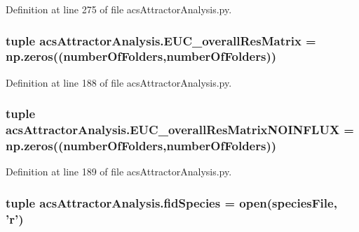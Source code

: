 Definition at line 275 of file acs\-Attractor\-Analysis.\-py.

\hypertarget{a00091_a920167afed4efad8feefc27bdbadba89}{
\subsubsection[{E\-U\-C\-\_\-overall\-Res\-Matrix}]{\setlength{\rightskip}{0pt plus 5cm}tuple acs\-Attractor\-Analysis.\-E\-U\-C\-\_\-overall\-Res\-Matrix = np.\-zeros(({\bf number\-Of\-Folders},{\bf number\-Of\-Folders}))}}\label{a00091_a920167afed4efad8feefc27bdbadba89}


Definition at line 188 of file acs\-Attractor\-Analysis.\-py.

\hypertarget{a00091_a4214c876be4247f0643fc749beb35787}{
\subsubsection[{E\-U\-C\-\_\-overall\-Res\-Matrix\-N\-O\-I\-N\-F\-L\-U\-X}]{\setlength{\rightskip}{0pt plus 5cm}tuple acs\-Attractor\-Analysis.\-E\-U\-C\-\_\-overall\-Res\-Matrix\-N\-O\-I\-N\-F\-L\-U\-X = np.\-zeros(({\bf number\-Of\-Folders},{\bf number\-Of\-Folders}))}}\label{a00091_a4214c876be4247f0643fc749beb35787}


Definition at line 189 of file acs\-Attractor\-Analysis.\-py.

\hypertarget{a00091_a604c9f75892d8d8aeac8306c94630a23}{
\subsubsection[{fid\-Species}]{\setlength{\rightskip}{0pt plus 5cm}tuple acs\-Attractor\-Analysis.\-fid\-Species = open({\bf species\-File}, '{\bf r}')}}\label{a00091_a604c9f75892d8d8aeac8306c94630a23}


